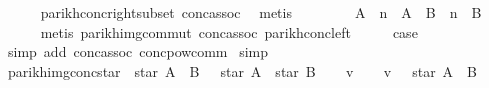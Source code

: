 \begin{isabellebody}
\ \ \ \ \isamarkupfalse%
\ parikh{\isacharunderscore}{\kern0pt}conc{\isacharunderscore}{\kern0pt}right{\isacharunderscore}{\kern0pt}subset\ conc{\isacharunderscore}{\kern0pt}assoc\ \isamarkupfalse%
\ metis\isanewline
\ \ \isamarkupfalse%
\ \isamarkupfalse%
\ {\isachardoublequoteopen}{\isasymdots}\ {\isacharequal}{\kern0pt}\ {\isasymPsi}\ {\isacharparenleft}{\kern0pt}A\ {\isacharcircum}{\kern0pt}{\isacharcircum}{\kern0pt}\ n\ {\isacharat}{\kern0pt}{\isacharat}{\kern0pt}\ A\ {\isacharat}{\kern0pt}{\isacharat}{\kern0pt}\ B\ {\isacharcircum}{\kern0pt}{\isacharcircum}{\kern0pt}\ n\ {\isacharat}{\kern0pt}{\isacharat}{\kern0pt}\ B{\isacharparenright}{\kern0pt}{\isachardoublequoteclose}\isanewline
\ \ \ \ \isamarkupfalse%
\ {\isacharparenleft}{\kern0pt}metis\ parikh{\isacharunderscore}{\kern0pt}img{\isacharunderscore}{\kern0pt}commut\ conc{\isacharunderscore}{\kern0pt}assoc\ parikh{\isacharunderscore}{\kern0pt}conc{\isacharunderscore}{\kern0pt}left{\isacharparenright}{\kern0pt}\isanewline
\ \ \isamarkupfalse%
\ \isamarkupfalse%
\ {\isacharquery}{\kern0pt}case\ \isamarkupfalse%
\ {\isacharparenleft}{\kern0pt}simp\ add{\isacharcolon}{\kern0pt}\ conc{\isacharunderscore}{\kern0pt}assoc\ conc{\isacharunderscore}{\kern0pt}pow{\isacharunderscore}{\kern0pt}comm{\isacharparenright}{\kern0pt}\isanewline
{}\isamarkupfalse%
\ simp%
\endisatagproof
{\isafoldproof}%
%
\isadelimproof
\isanewline
%
\endisadelimproof
\isanewline
{}\isamarkupfalse%
\ parikh{\isacharunderscore}{\kern0pt}img{\isacharunderscore}{\kern0pt}conc{\isacharunderscore}{\kern0pt}star{\isacharcolon}{\kern0pt}\ {\isachardoublequoteopen}{\isasymPsi}\ {\isacharparenleft}{\kern0pt}star\ {\isacharparenleft}{\kern0pt}A\ {\isacharat}{\kern0pt}{\isacharat}{\kern0pt}\ B{\isacharparenright}{\kern0pt}{\isacharparenright}{\kern0pt}\ {\isasymsubseteq}\ {\isasymPsi}\ {\isacharparenleft}{\kern0pt}star\ A\ {\isacharat}{\kern0pt}{\isacharat}{\kern0pt}\ star\ B{\isacharparenright}{\kern0pt}{\isachardoublequoteclose}\isanewline
%
\isadelimproof
%
\endisadelimproof
%
\isatagproof
{}\isamarkupfalse%
\isanewline
\ \ \isamarkupfalse%
\ v\isanewline
\ \ \isamarkupfalse%
\ {\isachardoublequoteopen}v\ {\isasymin}\ {\isasymPsi}\ {\isacharparenleft}{\kern0pt}star\ {\isacharparenleft}{\kern0pt}A\ {\isacharat}{\kern0pt}{\isacharat}{\kern0pt}\ B{\isacharparenright}{\kern0pt}{\isacharparenright}{\kern0pt}{\isachardoublequoteclose}\isanewline

\end{isabellebody}
